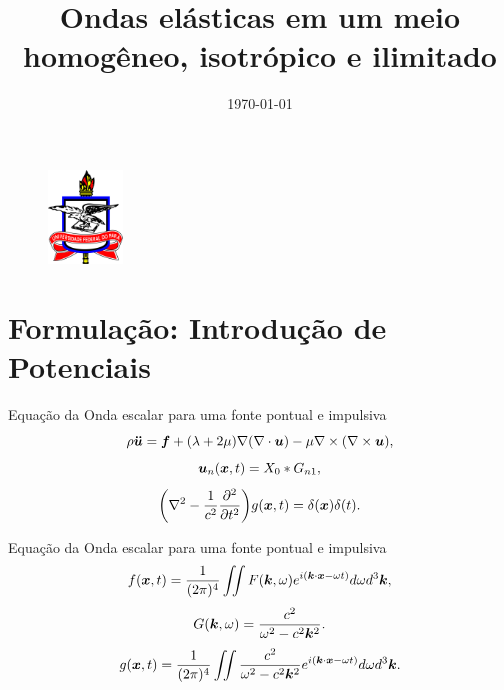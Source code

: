 \documentclass{beamer}
\title[Seminário]{Ondas elásticas em um meio homogêneo, isotrópico e ilimitado} %
\author{} %
\institute[UFPA] %
{
	Professor: Jessé Costa\\
Universidade Federal do Pará \\ %
\medskip
}
\date{\today} %
\begin{document}
 \begin{frame}
\begin{figure}[htb]
\centering
\includegraphics[width= 2cm, height= 2.5cm]{logo.jpg}
\end{figure}

\titlepage
\end{frame}

\section{Formulação: Introdução de Potenciais}

\begin{frame}{Equação da Onda escalar para uma fonte pontual e impulsiva}
\begin{equation}
\rho\boldsymbol{\ddot{u}} = \boldsymbol{f} + (\lambda + 2\mu)\nabla(\nabla\cdot\boldsymbol{u}) - \mu\nabla\times(\nabla\times\boldsymbol{u}),
\label{eq_onda} \nonumber
\end{equation}
\begin{equation}
\boldsymbol{u}_n(\boldsymbol{x},t) = X_0\ast{G_{n1}}, \nonumber
\end{equation}
\begin{equation}
\bigg(\nabla^2 - \frac{1}{c^2}\frac{\partial^2}{\partial{t^2}}\bigg)g(\boldsymbol{x},t) = \delta(\boldsymbol{x})\delta(t). \nonumber
\label{eq_onda_escalar}
\end{equation}
\end{frame}

\begin{frame}{Equação da Onda escalar para uma fonte pontual e impulsiva}
\begin{equation}
f(\boldsymbol{x},t) = \frac{1}{(2\pi)^4}\iint F(\boldsymbol{k},\omega)e^{i(\boldsymbol{k}\cdot\boldsymbol{x} - \omega t)}d\omega d^3\boldsymbol{k}, \nonumber
\end{equation}
\begin{equation}
G(\boldsymbol{k},\omega) = \frac{c^2}{\omega^2 - c^2\boldsymbol{k}^2}. \nonumber
\end{equation}
\begin{equation}
g(\boldsymbol{x},t) = \frac{1}{(2\pi)^4}\iint \frac{c^2}{\omega^2 - c^2\boldsymbol{k}^2} e^{i(\boldsymbol{k}\cdot\boldsymbol{x} - \omega t)}d\omega d^3\boldsymbol{k}.\nonumber
\end{equation}
	
\end{frame}
\end{document}
